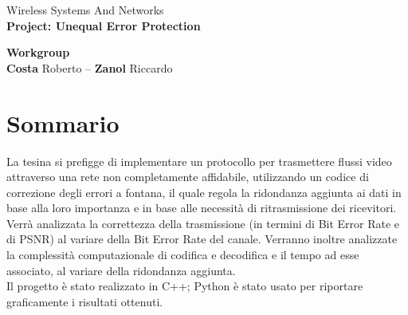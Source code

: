 \documentclass[italian, a4paper, 12pt]{article}
\newcommand{\horline}{\rule{1\linewidth}{0.9pt}}
\begin{document}
\begin{center}
	\Large Wireless Systems And Networks\\
	\huge \textbf{Project: Unequal Error Protection}\\[3mm]
	\begin{framed}
		\Large \textbf{Workgroup} \\[2mm]
		\normalsize \textbf{Costa} Roberto -- \textbf{Zanol} Riccardo
	\end{framed}
\end{center}	
\FloatBarrier
\section*{Sommario}
La tesina si prefigge di implementare un protocollo per trasmettere flussi video attraverso una rete non completamente affidabile, utilizzando un codice di correzione degli errori a fontana, il quale regola la ridondanza aggiunta ai dati in base alla loro importanza e in base alle necessità di ritrasmissione dei ricevitori.
Verrà analizzata la correttezza della trasmissione (in termini di Bit Error Rate e di PSNR) al variare della Bit Error Rate del canale. Verranno inoltre analizzate la complessità computazionale di codifica e decodifica e il tempo ad esse associato, al variare della ridondanza aggiunta.\\
Il progetto è stato realizzato in C++; Python è stato usato per riportare graficamente i risultati ottenuti.
\newpage
\end{document}
